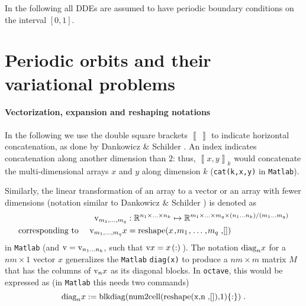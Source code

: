 \documentclass[11pt]{scrartcl}
\newcommand{\matlab}{\texttt{Matlab}}
\newcommand{\octave}{\texttt{octave}}
\newcommand{\R}{\mathbb{R}}
\newcommand{\mlvar}[1]{\lstinline[keywordstyle=\color{var}]!#1!}
\newcommand{\blist}[1]{\mbox{\lstinline!#1!}}
\newcommand{\llb}{\left\llbracket}
\newcommand{\rrb}{\right\rrbracket}
\renewcommand{\vec}{\blist{v}}
\newcommand{\diag}{\mbox{\mlvar{diag}}}
\begin{document}
In the following all DDEs are assumed to have periodic boundary
conditions on the interval $[0,1]$.

\section{Periodic orbits and their variational problems}
\label{sec:var}

\paragraph{Vectorization, expansion and reshaping notations}
In the following we use the double square brackets $\llb\,\rrb$ to
indicate horizontal concatenation, as done by Dankowicz \& Schilder
\cite{DS13}. An index indicates concatenation along another dimension
than $2$: thus, $\llb x, y\rrb_k$ would concatenate the
multi-dimensional arrays $x$ and $y$ along dimension $k$
(\blist{cat(k,x,y)} in \matlab{}).

Similarly, the linear transformation of an array to a vector or an
array with fewer dimensions (notation similar to Dankowicz \& Schilder
\cite{DS13}) is denoted as
\begin{align*}
  \vec_{m_1,\ldots,m_q}&:\R^{n_1\times \ldots \times n_k}\mapsto 
  \R^{m_1\times\ldots\times m_q\times (n_1\ldots n_k)/(m_1\ldots m_q)}\\
  \mbox{corresponding to \quad}
  \vec_{m_1,\ldots,m_q} x&=\mbox{$\blist{reshape(}x\blist{,}m_1\blist{,}\ldots\blist{,}m_q\blist{,[])}$}
\end{align*}
in \matlab{} (and $\vec=\vec_{n_1\ldots n_k}$, such that
$\vec x=x\blist{(:)}$). The notation $\diag_nx$ for a $nm\times1$
vector $x$ generalizes the \matlab{} \blist{diag(x)} to produce a
$nm\times m$ matrix $M$ that has the columns of $\vec_nx$ as its
diagonal blocks. In \octave{}, this would be expressed as (in
\matlab{} this needs two commands)
\begin{displaymath}
  \diag_nx:=\blist{blkdiag(num2cell(reshape(x,n,[]),1)\{:\})}\mbox{.}
\end{displaymath}
\end{document}
